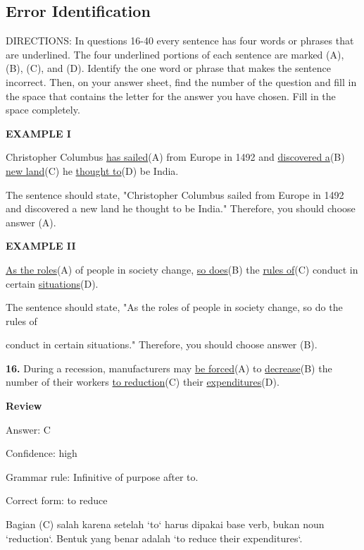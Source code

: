\documentclass[12pt]{article}
\begin{document}
\subsection*{Error Identification}
DIRECTIONS: In questions 16-40 every sentence has four words or phrases that are underlined. The four underlined portions of each sentence are marked (A), (B), (C), and (D). Identify the one word or phrase that makes the sentence incorrect. Then, on your answer sheet, find the number of the question and fill in the space that contains the letter for the answer you have chosen. Fill in the space completely.\par
\begin{exampleblock}
\textbf{EXAMPLE I}\par
Christopher Columbus \uline{has sailed}(A) from Europe in 1492 and \uline{discovered a}(B) \uline{new land}(C) he \uline{thought to}(D) be India.\par
The sentence should state, "Christopher Columbus sailed from Europe in 1492 and discovered a new land he thought to be India." Therefore, you should choose answer (A).\par
\end{exampleblock}
\begin{exampleblock}
\textbf{EXAMPLE II}\par
\uline{As the roles}(A) of people in society change, \uline{so does}(B) the \uline{rules of}(C) conduct in certain \uline{situations}(D).\par
The sentence should state, "As the roles of people in society change, so do the rules of\par
conduct in certain situations." Therefore, you should choose answer (B).\par
\end{exampleblock}
\noindent\textbf{16.} During a recession, manufacturers may \uline{be forced}(A) to \uline{decrease}(B) the number of their workers \uline{to reduction}(C) their \uline{expenditures}(D).
\par
\begingroup
\setlength{\parskip}{0pt}
\setlength{\parindent}{0pt}
\textbf{Review}\par
Answer: C\par
Confidence: high\par
Grammar rule: Infinitive of purpose after to.\par
Correct form: to reduce\par
Bagian (C) salah karena setelah `to` harus dipakai base verb, bukan noun `reduction`. Bentuk yang benar adalah `to reduce their expenditures`.\par
\end{document}
